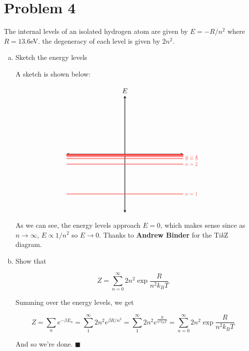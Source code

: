 \documentclass[10pt]{article}
\begin{document}
    \pagebreak
    \section*{Problem 4}

    The internal levels of an isolated hydrogen atom are given by $E = -R/n^2$ where $R = 13.6$eV. the degeneracy of each level is given by $2n^2$. 

    \begin{enumerate}[(a)]
    \item Sketch the energy levels
    
    \begin{solution}
        A sketch is shown below: 

        \[\begin{tikzpicture}[scale=0.15]
            \draw[thick, stealth-stealth] (-20,0) -- (20,0);
            \draw[thick, stealth-stealth] (0,-20) -- (0,20) node[anchor=south] {$E$};
            \draw[thick, red!70] (-20,-13.6) -- (20,-13.6) node[scale=0.75, anchor=west] {$n = 1$};
            \draw[thick, red!70] (-20,-3.4) -- (20,-3.4) node[scale=0.75, anchor=west] {$n = 2$};
            \draw[thick, red!70] (-20,-1.5111) -- (20,-1.5111) node[scale=0.75, anchor=west] {$n = 3$};
            \draw[thick, red!70] (-20, -0.85) -- (20,-0.85) node[scale=0.75, anchor=west] {$n = 4$};
            \filldraw[red!70] (-20,-0.544) -- (20,-0.544) -- (20,-0.001) -- (-20,-0.001) -- cycle node[scale=0.75, anchor=west] {$\dots$};
        \end{tikzpicture}\] 


        As we can see, the energy levels approach $E = 0$, which makes sense since as $n \to \infty$, $E \propto 1/n^2$ so $E \to 0$. Thanks to \textbf{Andrew Binder} for the Ti\textit kZ diagram.
    \end{solution}
    \item Show that 
    
    \[ Z = \sum_{n = 0}^\infty 2n^2 \exp{\frac{R}{n^2k_BT}}\]

    \begin{solution}
        Summing over the energy levels, we get 

        \[ Z = \sum_n e^{-\beta E_n} = \sum_1^\infty 2n^2 e^{\beta R/n^2} = \sum_1^\infty 2n^2e^{\frac{R}{n^2k_BT}} = \sum_{n = 0}^\infty 2n^2 \exp{\frac{R}{n^2k_BT}}\]

        And so we're done. $\blacksquare$
    \end{solution}
    \end{enumerate}
\end{document}

